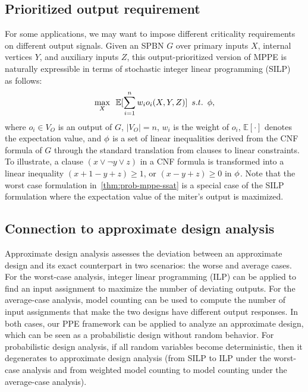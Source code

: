 \subsection{Prioritized output requirement}
For some applications,
we may want to impose different criticality requirements on different output signals.
Given an SPBN $G$ over
primary inputs $X$,
internal vertices $Y$,
and auxiliary inputs $Z$,
this output-prioritized version of MPPE is naturally expressible
in terms of stochastic integer linear programming (SILP)~\cite{Schultz2003} as follows:
\begin{align*}
    \max_X \enskip \mathbb{E}[\sum_{i=1}^n w_i o_i(X,Y,Z)] \enskip s.t. \enskip \phi,
\end{align*}
where $o_i \in V_O$ is an output of $G$, $|V_O|=n$,
$w_i$ is the weight of $o_i$,
$\mathbb{E}[\cdot]$ denotes the expectation value,
and $\phi$ is a set of linear inequalities derived from the CNF formula of $G$
through the standard translation from clauses to linear constraints.
To illustrate, a clause $(x \lor \lnot y \lor z)$ in a CNF formula is transformed into
a linear inequality $(x+1-y+z)\geq 1$,
or $(x-y+z)\geq 0$ in $\phi$.
Note that the worst case formulation in~\cref{thm:prob-mppe-ssat} is a special case of
the SILP formulation where the expectation value of the miter's output is maximized.

\subsection{Connection to approximate design analysis}
Approximate design analysis assesses the deviation between
an approximate design and its exact counterpart in two scenarios:
the worse and average cases.
For the worst-case analysis, integer linear programming (ILP) can be applied
to find an input assignment to maximize the number of deviating outputs.
For the average-case analysis, model counting can be used
to compute the number of input assignments that make the two designs have different output responses.
In both cases, our PPE framework can be applied to analyze an approximate design,
which can be seen as a probabilistic design without random behavior.
For probabilistic design analysis,
if all random variables become deterministic,
then it degenerates to approximate design analysis
(from SILP to ILP under the worst-case analysis and
from weighted model counting to model counting under the average-case analysis).